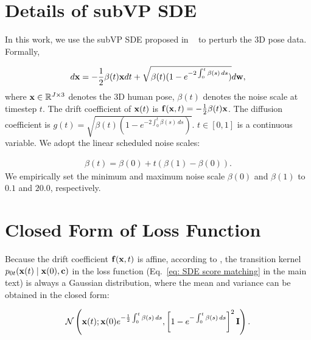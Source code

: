 \documentclass[10pt,twocolumn,letterpaper]{article}
\begin{document}
%
 
{\small


}

\clearpage


\appendix








\section{Details of subVP SDE}
In this work, we use the subVP SDE proposed in ~\cite{song2020score} to perturb the 3D pose data. Formally, 

\begin{equation}
\begin{aligned}
    d\mathbf{x} = - \frac{1}{2} \beta(t) \mathbf{x} dt + \sqrt{ \beta (t) ( 1 -  e^{-2  \int_{0}^{t} \beta (s) \, ds } ) }   d\mathbf{w},
\end{aligned}
\end{equation}
where $\mathbf{x} \in \mathbb{R}^{J \times 3}$ denotes the 3D human pose, $\beta (t)$ denotes the noise scale at timestep $t$.
The drift coefficient of $\mathbf{x} (t)$ is $\mathbf{f}(\mathbf{x}, t) = - \frac{1}{2} \beta(t) \mathbf{x} $. The diffusion coefficient is $g(t) = \sqrt{ \beta (t) ( 1 -  e^{-2  \int_{0}^{t} \beta (s) \, ds } ) }$.
$t \in [0, 1]$ is a continuous variable. We adopt the linear scheduled noise scales:

\begin{equation}
\begin{aligned}
    \beta (t) = \beta(0) + t \left( \beta(1) - \beta(0) \right).
\end{aligned}
\end{equation}
We empirically set the minimum and maximum noise scale $\beta(0)$ and $\beta(1)$ to $0.1$ and $20.0$, respectively.


\section{Closed Form of Loss Function}
Because the drift coefficient $\mathbf{f}(\mathbf{x}, t)$ is affine, according to \cite{song2020score}, the transition kernel $p_{0t}(\mathbf{x}(t) \mid \mathbf{x}(0), \mathbf{c})$ in the loss function (Eq.~\ref{eq: SDE score matching} in the main text) is always a Gaussian distribution, where the mean and variance can be obtained in the closed form:

\begin{equation}
\begin{aligned}
    \mathcal{N} \left( \mathbf{x}(t);\mathbf{x}(0) e^{- \frac{1}{2}  \int_{0}^{t} \beta (s) \, ds }, \left[ 1 -  e^{-\int_{0}^{t} \beta (s) \, ds }\right]^2 \mathbf{I} \right).
\end{aligned}
\label{eq:trans_kernal}
\end{equation}
\end{document}

